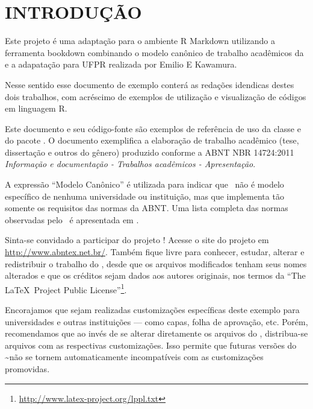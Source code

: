 \documentclass[12pt,]{04-class-files/abntex2}
\begin{document}




\textual

\pagestyle{simple}

\chapter[INTRODUÇÃO]{INTRODUÇÃO}

Este projeto é uma adaptação para o ambiente R Markdown utilizando a ferramenta bookdown combinando o modelo canônico de trabalho acadêmicos da \abnTeX e a adapatação para UFPR realizada por Emilio E Kawamura.

Nesse sentido esse documento de exemplo conterá as redações idendicas destes dois trabalhos, com acréscimo de exemplos de utilização e visualização de códigos em linguagem R.

Este documento e seu código-fonte são exemplos de referência de uso da classe
\textcite{abntex2} e do pacote \textcite{abntex2cite}. O documento
exemplifica a elaboração de trabalho acadêmico (tese, dissertação e outros do
gênero) produzido conforme a ABNT NBR 14724:2011 \emph{Informação e documentação
- Trabalhos acadêmicos - Apresentação}.

A expressão ``Modelo Canônico'' é utilizada para indicar que \abnTeX~não é
modelo específico de nenhuma universidade ou instituição, mas que implementa tão
somente os requisitos das normas da ABNT. Uma lista completa das normas
observadas pelo \abnTeX~é apresentada em \textcite{abntex2classe}.

Sinta-se convidado a participar do projeto \abnTeX! Acesse o site do projeto em
\url{http://www.abntex.net.br/}. Também fique livre para conhecer,
estudar, alterar e redistribuir o trabalho do \abnTeX, desde que os arquivos
modificados tenham seus nomes alterados e que os créditos sejam dados aos
autores originais, nos termos da ``The \LaTeX~Project Public
License''\footnote{\url{http://www.latex-project.org/lppl.txt}}.

Encorajamos que sejam realizadas customizações específicas deste exemplo para
universidades e outras instituições --- como capas, folha de aprovação, etc.
Porém, recomendamos que ao invés de se alterar diretamente os arquivos do
\abnTeX, distribua-se arquivos com as respectivas customizações.
Isso permite que futuras versões do \abnTeX\textasciitilde{}não se tornem automaticamente
incompatíveis com as customizações promovidas.
\end{document}
